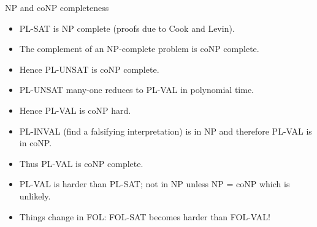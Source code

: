 \documentclass[style=sailor,size=12pt]{powerdot}
\theoremstyle{definition}
\begin{document}
\begin{wideslide}[bm=,toc=]{NP and coNP completeness}
\begin{itemize}
\item PL-SAT is NP complete (proofs due to Cook and Levin).
\item The complement of an NP-complete problem is coNP complete.
\item Hence PL-UNSAT is coNP complete.
\item PL-UNSAT many-one reduces to PL-VAL in polynomial time.
\item Hence PL-VAL is coNP hard.
\item PL-INVAL (find a falsifying interpretation) is in NP and therefore PL-VAL is in coNP.
\item Thus PL-VAL is coNP complete.
\item PL-VAL is harder than PL-SAT; not in NP unless NP = coNP which is unlikely.
\item Things change in FOL: FOL-SAT becomes harder than FOL-VAL!
\end{itemize}
\end{wideslide}
\end{document}
